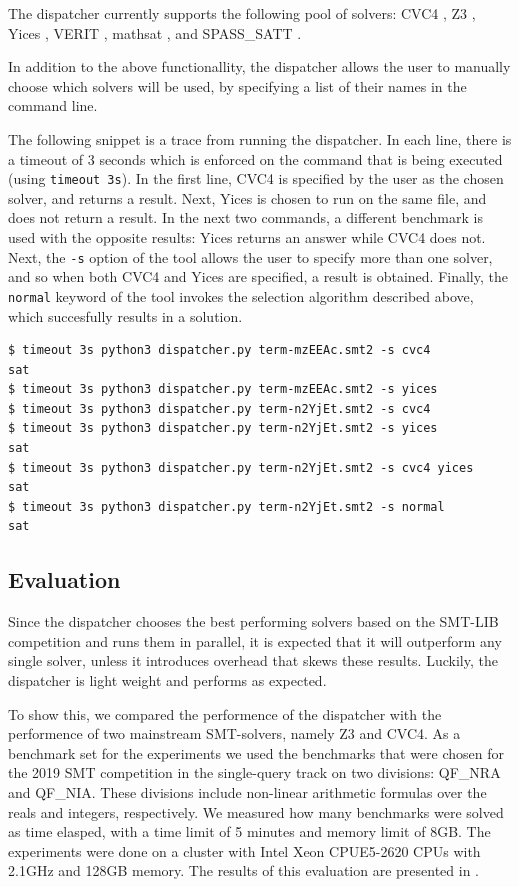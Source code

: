 \documentclass{article}
\begin{document}
The dispatcher currently supports the following pool of solvers:
CVC4 \cite{CVC4},
Z3 \cite{Z3},
Yices \cite{Dutertre:cav2014},
VERIT \cite{10.1007/978-3-642-02959-2_12},
mathsat \cite{mathsat5},
and
SPASS\_SATT \cite{10.1007/978-3-030-29436-6_7}.


In addition to the above functionallity, the dispatcher allows the user to manually choose
which solvers will be used, by specifying a list of their names in the command line.

The following snippet is a trace from running the dispatcher.
In each line, there is a timeout of 3 seconds which is enforced on the command that
is being executed (using \verb!timeout 3s!).
In the first line, CVC4 is specified by the user as the chosen solver, 
and returns a result.
Next, Yices is chosen to run on the same file, and does not return a result.
In the next two commands, a different benchmark is used with the opposite results:
Yices returns an answer while CVC4 does not.
Next, the \verb!-s! option of the tool allows the user to specify more than one solver,
and so when both CVC4 and Yices are specified, a result is obtained.
Finally, the \verb!normal! keyword of the tool invokes the selection algorithm
described above, which succesfully results in a solution.

\begin{center}
\begin{verbatim}
$ timeout 3s python3 dispatcher.py term-mzEEAc.smt2 -s cvc4
sat
$ timeout 3s python3 dispatcher.py term-mzEEAc.smt2 -s yices
$ timeout 3s python3 dispatcher.py term-n2YjEt.smt2 -s cvc4
$ timeout 3s python3 dispatcher.py term-n2YjEt.smt2 -s yices
sat
$ timeout 3s python3 dispatcher.py term-n2YjEt.smt2 -s cvc4 yices
sat
$ timeout 3s python3 dispatcher.py term-n2YjEt.smt2 -s normal
sat
\end{verbatim}
\end{center}

\subsection{Evaluation}

Since the dispatcher chooses the best performing solvers based on
the SMT-LIB competition
and runs them in parallel,
it is expected that it will outperform any single solver,
unless it introduces overhead that skews these results.
Luckily, the dispatcher is light weight and performs
as expected.

To show this, we compared the performence of the dispatcher
with the performence of two mainstream SMT-solvers,
namely Z3 and CVC4.
As a benchmark set for the experiments we used the benchmarks that were chosen for the 2019 SMT competition in the single-query track on two divisions:
QF\_NRA and QF\_NIA.
These divisions include non-linear arithmetic formulas
over the reals and integers, respectively.
We measured how many benchmarks were solved as time
elasped, with
a time limit of 5 minutes and memory limit of 8GB.
%
The experiments were done on
a cluster with Intel Xeon CPUE5-2620 CPUs with 2.1GHz and 128GB memory.
The results of this evaluation are presented in
.
\end{document}
